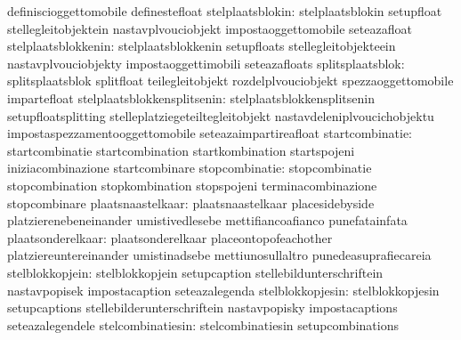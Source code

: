                                  definiscioggettomobile           definestefloat
                stelplaatsblokin: stelplaatsblokin                 setupfloat
                                  stellegleitobjektein             nastavplvouciobjekt
                                  impostaoggettomobile             seteazafloat
             stelplaatsblokkenin: stelplaatsblokkenin              setupfloats
                                  stellegleitobjekteein            nastavplvouciobjekty
                                  impostaoggettimobili             seteazafloats
                splitsplaatsblok: splitsplaatsblok                 splitfloat
                                  teilegleitobjekt                 rozdelplvouciobjekt
                                  spezzaoggettomobile              impartefloat
     stelplaatsblokkensplitsenin: stelplaatsblokkensplitsenin      setupfloatsplitting
                                  stelleplatziegeteiltegleitobjekt nastavdeleniplvoucichobjektu
                                  impostaspezzamentooggettomobile  seteazaimpartireafloat
                 startcombinatie: startcombinatie                  startcombination
                                  startkombination                 startspojeni
                                  iniziacombinazione               startcombinare
                  stopcombinatie: stopcombinatie                   stopcombination
                                  stopkombination                  stopspojeni
                                  terminacombinazione              stopcombinare
               plaatsnaastelkaar: plaatsnaastelkaar                placesidebyside
                                  platzierenebeneinander           umistivedlesebe
                                  mettifiancoafianco               punefatainfata
               plaatsonderelkaar: plaatsonderelkaar                placeontopofeachother
                                  platziereuntereinander           umistinadsebe
                                  mettiunosullaltro                punedeasuprafiecareia
                 stelblokkopjein: stelblokkopjein                  setupcaption
                                  stellebildunterschriftein        nastavpopisek
                                  impostacaption                   seteazalegenda %
                stelblokkopjesin: stelblokkopjesin                 setupcaptions
                                  stellebilderunterschriftein      nastavpopisky
                                  impostacaptions                  seteazalegendele %
               stelcombinatiesin: stelcombinatiesin                setupcombinations
